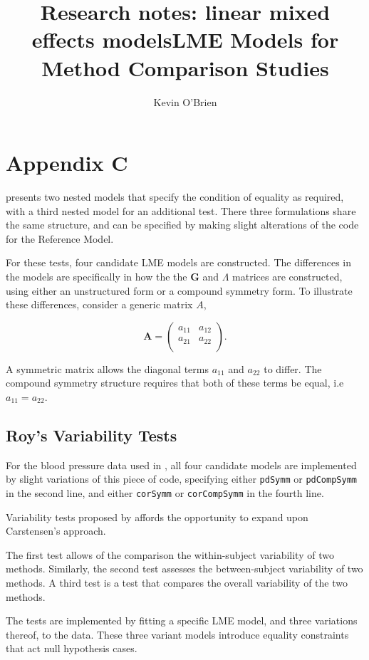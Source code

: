 \documentclass[12pt, a4paper]{report}
\title{Research notes: linear mixed effects models}
\author{ } \date{ }
\theoremstyle{plain}
\theoremstyle{definition}
\theoremstyle{remark}
\begin{document}
\author{Kevin O'Brien}
\title{LME Models for Method Comparison Studies}

\chapter{Appendix C}
\citet{ARoy2009} presents two nested models that specify the condition of equality as required, with a third nested model for an additional test. There three formulations share the same structure, and can be specified by making slight alterations of the code for the Reference Model.

 For these tests, four candidate LME models are constructed. The differences in the models are specifically in how the the $\boldsymbol{G}$ and $\Lambda$ matrices are constructed, using either an unstructured form or a compound symmetry form. To illustrate these differences, consider a generic matrix $A$,

\[
\boldsymbol{A} = \left( \begin{array}{cc}
a_{11} & a_{12}  \\
a_{21} & a_{22}  \\
\end{array}\right).
\]

A symmetric matrix allows the diagonal terms $a_{11}$ and $a_{22}$ to differ. The compound symmetry structure requires that both of these terms be equal, i.e $a_{11} = a_{22}$.

\section{Roy's Variability Tests}
For the blood pressure data used in \citet{ARoy2009}, all four candidate models are implemented by slight variations of this piece of code, specifying either \texttt{pdSymm} or \texttt{pdCompSymm} in the second line, and either \texttt{corSymm} or \texttt{corCompSymm} in the fourth line.



Variability tests proposed by \citet{ARoy2009} affords the opportunity to expand upon Carstensen's approach.

The first test allows of the comparison the within-subject variability of two methods. Similarly, the second test
assesses the between-subject variability of two methods. A third test is a test that compares the overall variability of the two methods.

The tests are implemented by fitting a specific LME model, and three variations thereof, to the data. These three variant models introduce equality constraints that act null hypothesis cases.
\end{document}
